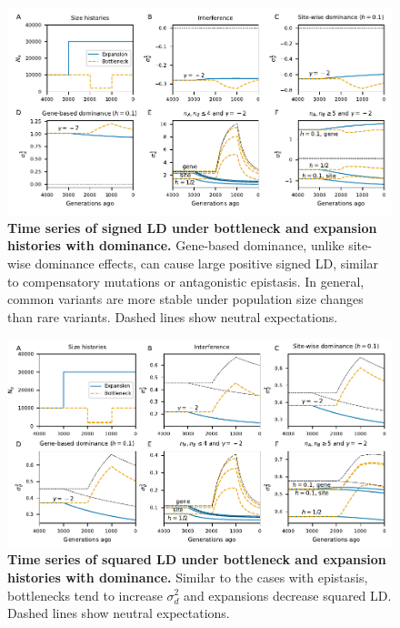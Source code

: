 \documentclass[]{article}
\begin{document}
\begin{figure}[ht!]
    \centering
    \includegraphics{../figures/demog_bottle_expand.dominance}
    \caption{
        \textbf{Time series of signed LD under bottleneck 
        and expansion histories with dominance.}
        Gene-based dominance, unlike site-wise dominance effects, can cause
        large positive signed LD, similar to compensatory mutations or
        antagonistic epistasis. In general, common variants are more
        stable under population size changes than rare variants.
        Dashed lines show neutral expectations.
    }
    \label{fig:toy_dom}
\end{figure}

\begin{figure}[ht!]
    \centering
    \includegraphics{../figures/demog_bottle_expand.dominance.sd2}
    \caption{
        \textbf{Time series of squared LD under bottleneck 
        and expansion histories with dominance.}
        Similar to the cases with epistasis, bottlenecks tend to increase
        \(\sigma_d^2\) and expansions decrease squared LD.
        Dashed lines show neutral expectations.
    }
    \label{fig:toy_dom_sd2}
\end{figure}
\end{document}
